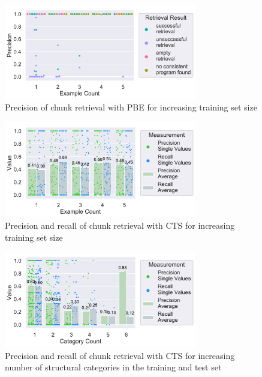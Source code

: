\documentclass[\myrootdir/main.tex]{subfiles}
\begin{document}
\begin{figure}[htbp]
		\centering
		\includegraphics[width=0.75\textwidth, clip]{img/big-study/precision-extraction-result-PBE.pdf}
		\caption{Precision of chunk retrieval with PBE for increasing training set size}
		\label{fig:precision-extraction-result-PBE}
\end{figure}

\begin{figure}[htbp]
		\centering
		\includegraphics[width=0.75\textwidth, clip]{img/big-study/recall-precision-examplecount-CTS.pdf}
		\caption{Precision and recall of chunk retrieval with CTS for increasing training set size}
		\label{fig:recall-precision-examplecount-CTS}
\end{figure}

\begin{figure}[htbp]
		\centering
		\includegraphics[width=0.75\textwidth, clip]{img/big-study/recall-precision-categorycount-CTS.pdf}
		\caption{Precision and recall of chunk retrieval with CTS for increasing number of structural categories in the training and test set}
		\label{fig:recall-precision-categorycount-CTS}
\end{figure}
\end{document}
